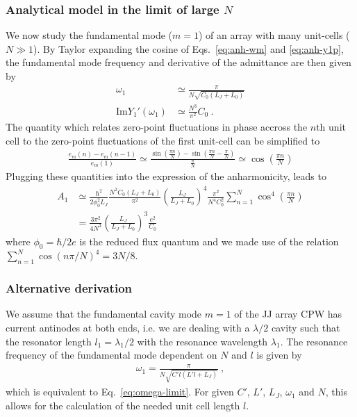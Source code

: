 \subsubsection{Analytical model in the limit of large $N$}\label{sec:analytical-largeN}

We now study the fundamental mode ($m=1$) of an array with many unit-cells ($N\gg 1$).
%
By Taylor expanding the cosine of Eqs.~\eqref{eq:anh-wm} and \eqref{eq:anh-y1p}, the fundamental mode frequency and derivative of the admittance are then given by
\begin{align}
\omega_1 &\simeq \frac{\pi}{N\sqrt{C_0(L_J+L_0)}} \label{eq:omega-limit}\\
\text{Im}Y_1'(\omega_1) &\simeq\frac{N^3}{\pi^2}C_0\ .
\end{align}
% 
The quantity which relates zero-point fluctuations in phase accross the $n$th unit cell to the zero-point fluctuations of the first unit-cell can be simplified to
\begin{align}
\frac{e_m(n)-e_m(n-1)}{e_m(1)}\simeq \frac{\sin(\frac{\pi n}{N})-\sin(\frac{\pi n}{N}-\frac{\pi}{N})}{\frac{\pi}{N}}\simeq \cos\left(\frac{\pi n}{N}\right)
\end{align}
Plugging these quantities into the expression of the anharmonicity, leads to
\begin{align}
A_1 &\simeq \frac{\hbar^2}{2\phi_0^2L_J }\frac{N^2C_0(L_J+L_0)}{\pi^2}\left(\frac{L_J}{L_J+L_0}\right)^4 \frac{\pi^2}{N^4C_0^2} \sum_{n=1}^{N}\cos^4\left(\frac{\pi n}{N}\right) \\
&= \frac{3\pi^2}{4N^3}\left(\frac{L_J}{L_J+L_0}\right)^3 \frac{e^2}{C_0}
\label{eq:anh-limit}
\end{align}
where $\phi_0 = \hbar/2e$ is the reduced flux quantum and we made use of the relation $\sum_{n=1}^N \cos(n\pi/N)^4=3N/8$.

\subsubsection{Alternative derivation}

We assume that the fundamental cavity mode $m=1$ of the JJ array CPW has current antinodes at both ends, i.e. we are dealing with a $\lambda/2$ cavity such that the resonator length $l_1 = \lambda_1/2$ with the resonance wavelength $\lambda_1$.
%
The resonance frequency of the fundamental mode dependent on $N$ and $l$ is given by
%
\begin{align}
\omega_1 = \frac{\pi}{N\sqrt{C'l\left(L'l + L_J\right)}} \ ,
\end{align}
%
which is equivalent to Eq.~\eqref{eq:omega-limit}.
% 
For given $C'$, $L'$, $L_J$, $\omega_1$ and $N$, this allows for the calculation of the needed unit cell length $l$.

